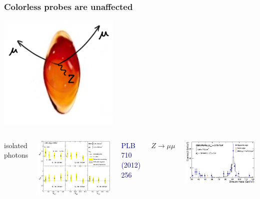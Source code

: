 \documentclass[compress]{beamer}
\begin{document}
\begin{frame}
\frametitle{Colorless probes are unaffected}

\vspace{-0.75 cm}
\hspace{5.6 cm} \includegraphics[height=1.5 cm]{droplets3_small.png}

\vspace{-0.5 cm}

\begin{columns}
\centering isolated photons

\centering \includegraphics[width=0.93\linewidth]{dijets/photon_raa_centrality.png}

\centering \textcolor{darkblue}{\scriptsize PLB 710 (2012) 256}


\centering $Z \to \mu \mu$

\includegraphics[width=\linewidth]{dimuons/z_mass.png}


\end{columns}
\end{frame}
\end{document}
